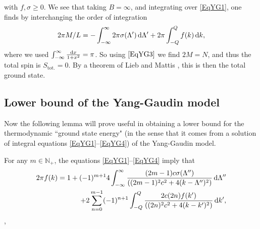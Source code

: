 with $  f,\sigma\geq 0 $. We see that taking $ B=\infty $, and integrating over \eqref{EqYG1}, one finds by interchanging the order of integration \begin{equation}
2\pi M/L=-\int_{-\infty}^{\infty} 2\pi \sigma(\Lambda')\mathop{}\!\mathrm{d} \Lambda'+ 2\pi \int_{-Q}^{Q} f(k)\mathop{}\!\mathrm{d} k,
\end{equation}
where we used $ \int_{-\infty}^{\infty}\frac{\mathop{}\!\mathrm{d} x}{1+x^2}=\pi $. So using $ \eqref{EqYG3} $ we find $ 2M=N $, and thus the total spin is $ S_{\text{tot.}}=0 $. By a theorem of Lieb and Mattis \cite{lieb1962theory}, this is then the total ground state.
\subsection{Lower bound of the Yang-Gaudin model}
Now the following lemma will prove useful in obtaining a lower bound for the thermodynamic ``ground state energy" (in the sense that it comes from a solution of integral equations \eqref{EqYG1}--\eqref{EqYG4}) of the Yang-Gaudin model.
\begin{lemma}\label{LemmaYGrho}
	For any $ m\in \mathbb{N}_+ $, the equations \eqref{EqYG1}--\eqref{EqYG4} imply that \begin{equation}\label{EqYG5}
	\begin{aligned}
	2\pi  f(k)=1+(-1)^{m+1}4\int_{-\infty}^{\infty}\frac{ (2m-1)c\sigma(\Lambda'')}{((2m-1)^2 c^2+4(k-\Lambda'')^2)}\mathop{}\!\mathrm{d}\Lambda''\\
	+2\sum_{n=0}^{m-1}(-1)^{n+1}\int_{-Q}^{Q}\frac{2c(2n) f(k')}{((2n)^2c^2+4(k-k')^2)}\mathop{}\!\mathrm{d} k',
	\end{aligned}
	\end{equation},
\end{lemma}

